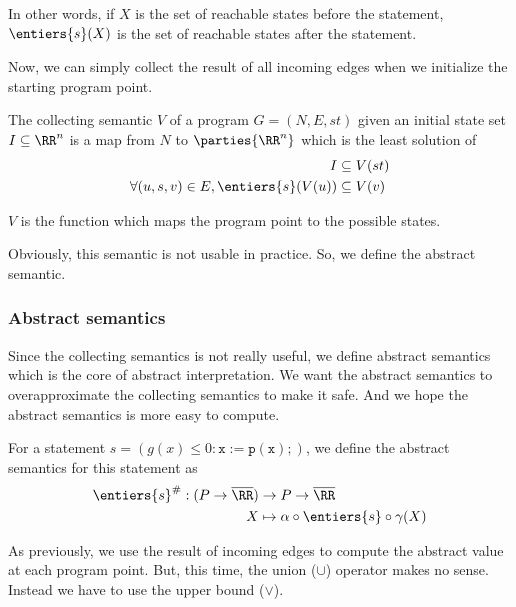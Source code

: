 \documentclass[a4paper, twoside, 10pt]{article}
\begin{document}
In other words, if $X$ is the set of reachable states before the statement, $\entiers{s}(X)$ is the set of reachable states after the statement.

\bigskip

Now, we can simply collect the result of all incoming edges when we initialize the starting program point.

\begin{definition}
The collecting semantic $V$ of a program $G=(N,E,st)$ given an initial state set $I \subseteq\RR^n$ is a map from $N$ to $\parties{\RR^n}$ which is the least solution of
\[
    \begin{aligned}
        I &\subseteq V(st)\\
        \forall (u,s,v) \in E, \entiers{s}(V(u)) &\subseteq V(v)
    \end{aligned}
\]
\end{definition}

$V$ is the function which maps the program point to the possible states.

Obviously, this semantic is not usable in practice. So, we define the abstract semantic.

\subsubsection{Abstract semantics}

Since the collecting semantics is not really useful, we define abstract semantics which is the core of abstract interpretation. We want the abstract semantics to overapproximate the collecting semantics to make it safe. And we hope the abstract semantics is more easy to compute.

\begin{definition}
    For a statement $s = (g(x) \leqslant 0: \mathtt{x := p(x);})$, we define the abstract semantics for this statement as
    \[
        \begin{aligned}
            \entiers{s}^\#: (P\to \overline{\RR}) &\to P\to \overline{\RR} \\
            X &\mapsto \alpha \circ \entiers{s} \circ \gamma(X)
        \end{aligned}
    \]
\end{definition}

\bigskip

As previously, we use the result of incoming edges to compute the abstract value at each program point. But, this time, the union ($\cup$) operator makes no sense. Instead we have to use the upper bound ($\vee$).
\end{document}
